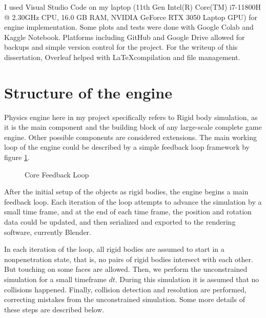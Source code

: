 \documentclass[12pt,a4paper,twoside,openright]{report}
\begin{document}
I used Visual Studio Code on my laptop (11th Gen Intel(R) Core(TM) i7-11800H @ 2.30GHz CPU, 16.0 GB RAM, NVIDIA GeForce RTX 3050 Laptop GPU) for engine implementation. Some plots and tests were done with Google Colab and Kaggle Notebook. Platforms including GitHub and Google Drive allowed for backups and simple version control for the project. For the writeup of this dissertation, Overleaf helped with \LaTeX compilation and file management.

\section{Structure of the engine}

Physics engine here in my project specifically refers to Rigid body simulation, as it is the main component and the building block of any large-scale complete game engine. Other possible components are considered extensions. The main working loop of the engine could be described by a simple feedback loop framework by figure \ref{looplbl}.
\begin{figure}
    \centering
{}
\caption{Core Feedback Loop}
\label{looplbl}
\end{figure}

After the initial setup of the objects as rigid bodies, the engine begins a main feedback loop. Each iteration of the loop attempts to advance the simulation by a small time frame, and at the end of each time frame, the position and rotation data could be updated, and then serialized and exported to the rendering software, currently Blender.

In each iteration of the loop, all rigid bodies are assumed to start in a nonpenetration state, that is, no pairs of rigid bodies intersect with each other. But touching on some faces are allowed. Then, we perform the unconstrained simulation for a small timeframe $dt$. During this simulation it is assumed that no collisions happened. Finally, collision detection and resolution are performed, correcting mistakes from the unconstrained simulation. Some more details of these steps are described below.
\end{document}
